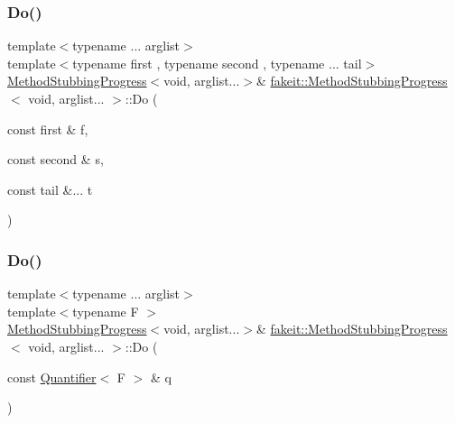 \mbox{\label{structfakeit_1_1MethodStubbingProgress_3_01void_00_01arglist_8_8_8_01_4_a45b048006587b626f8220aa4b196de2a}} 
\subsubsection{\texorpdfstring{Do()}{Do()}\hspace{0.1cm}{\footnotesize\ttfamily [18/27]}}
{\footnotesize\ttfamily template$<$typename ... arglist$>$ \\
template$<$typename first , typename second , typename ... tail$>$ \\
\mbox{\hyperlink{structfakeit_1_1MethodStubbingProgress}{Method\+Stubbing\+Progress}}$<$void, arglist...$>$\& \mbox{\hyperlink{structfakeit_1_1MethodStubbingProgress}{fakeit\+::\+Method\+Stubbing\+Progress}}$<$ void, arglist... $>$\+::Do (\begin{DoxyParamCaption}\item[{const first \&}]{f,  }\item[{const second \&}]{s,  }\item[{const tail \&...}]{t }\end{DoxyParamCaption})\hspace{0.3cm}{\ttfamily [inline]}}

\mbox{\label{structfakeit_1_1MethodStubbingProgress_3_01void_00_01arglist_8_8_8_01_4_a3091661d404ffecf2733281471d536c4}} 
\subsubsection{\texorpdfstring{Do()}{Do()}\hspace{0.1cm}{\footnotesize\ttfamily [19/27]}}
{\footnotesize\ttfamily template$<$typename ... arglist$>$ \\
template$<$typename F $>$ \\
\mbox{\hyperlink{structfakeit_1_1MethodStubbingProgress}{Method\+Stubbing\+Progress}}$<$void, arglist...$>$\& \mbox{\hyperlink{structfakeit_1_1MethodStubbingProgress}{fakeit\+::\+Method\+Stubbing\+Progress}}$<$ void, arglist... $>$\+::Do (\begin{DoxyParamCaption}\item[{const \mbox{\hyperlink{structfakeit_1_1Quantifier}{Quantifier}}$<$ F $>$ \&}]{q }\end{DoxyParamCaption})\hspace{0.3cm}{\ttfamily [inline]}}

